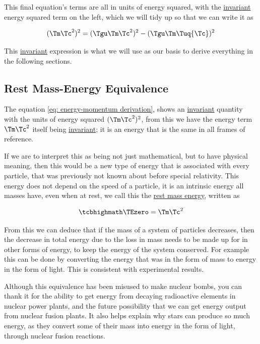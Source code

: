 This final equation's terms are all in units of energy squared, with the \hyperlink{def-lorentz-invariant}{invariant} energy squared term on the left, which we will tidy up so that we can write it as

\begin{equation}
	\label{eq: energy-momentum derivation}
	(\Tm  \Tc ^2)^2  = (\Tgu  \Tm  \Tc ^2)^2 - (\Tgu  \Tm  \Tuq  {\Tc })^2
\end{equation}

This \hyperlink{def-lorentz-invariant}{invariant} expression is what we will use as our basis to derive everything in the following sections.

\subsection{Rest Mass-Energy Equivalence}\label{subsect: Rest Mass-Energy Equivalence}

The equation \eqref{eq: energy-momentum derivation}, shows an \hyperlink{def-lorentz-invariant}{invariant} quantity with the units of energy squared $(\Tm  \Tc ^2)^2$, from this we have the energy term $\Tm  \Tc ^2$ itself being \hyperlink{def-lorentz-invariant}{invariant}; it is an energy that is the same in all frames of reference.

If we are to interpret this as being not just mathematical, but to have physical meaning, then this would be a new type of energy that is associated with every particle, that was previously not known about before special relativity.
This energy does not depend on the speed of a particle, it is an intrinsic energy all masses have, even when at rest, we call this the \hyperlink{def-rest-mass-energy}{rest mass energy}, written as

\begin{equation}
	\label{eq: rest mass energy}
	\mhl{
		\TEzero =\Tm \Tc ^2
	}
\end{equation}

From this we can deduce that if the mass of a system of particles decreases, then the decrease in total energy due to the loss in mass needs to be made up for in other forms of energy, to keep the energy of the system conserved.
For example this can be done by converting the energy that was in the form of mass to energy in the form of light.
This is consistent with experimental results.

Although this equivalence has been misused to make nuclear bombs, you can thank it for the ability to get energy from decaying radioactive elements in nuclear power plants, and the future possibility that we can get energy output from nuclear fusion plants.
It also helps explain why stars can produce so much energy, as they convert some of their mass into energy in the form of light, through nuclear fusion reactions.

